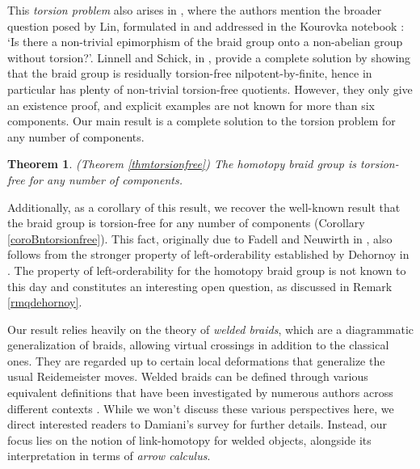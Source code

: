 \documentclass[11pt, a4paper, twoside,reqno]{amsart}
\theoremstyle{plain}
\newtheorem*{thm0}{Theorem}
\theoremstyle{definition}
\theoremstyle{remark}
\begin{document}
This \emph{torsion problem} also arises in \cite{BardaVershinJieHomotopyBraid}, where the authors mention the broader question posed by Lin, formulated in \cite{LinBraidsPermutationPolynomials} and addressed in the Kourovka notebook \cite{MazurovKhukhroKourovkaNotebook}: \lq Is there a non-trivial epimorphism of the braid group onto a non-abelian group without torsion?\rq. Linnell and Schick, in \cite{LinnellchickFinititgrpextAtiyahconj}, provide a complete solution by showing that the braid group is residually torsion-free nilpotent-by-finite, hence in particular has plenty of non-trivial torsion-free quotients. However, they only give an existence proof, and explicit examples are not known for more than six components. Our main result is a complete solution to the torsion problem for any number of components.

\begin{thm0}(Theorem \ref{thmtorsionfree})
     The homotopy braid group is torsion-free for any number of components.
\end{thm0}

Additionally, as a corollary of this result, we recover the well-known result that the braid group is torsion-free for any number of components (Corollary \ref{coroBntorsionfree}). This fact, originally due to Fadell and Neuwirth in \cite[Thm. 8]{FadellNeuwirthConfSpace}, also follows from the stronger property of left-orderability established by Dehornoy in \cite{DehornoyBraidGrpLeftDistribuOp}. The property of left-orderability for the homotopy braid group is not known to this day and constitutes an interesting open question, as discussed in Remark \ref{rmqdehornoy}.

Our result relies heavily on the theory of \emph{welded braids}, which are a diagrammatic generalization of braids, allowing virtual crossings in addition to the classical ones. They are regarded up to certain local deformations that generalize the usual Reidemeister moves. Welded braids can be defined through various equivalent definitions that have been investigated by numerous authors across different contexts \cite{FennRimanyiRourkeBraidPermuGrp,SavushkinaGrpConjAutoFreeGrp,McCoolBasisConjAutoFreeGrp,BaezWiseCransExoticStatsStrings4DTheory,BrendleHatcherConfigspaceRingsWickets,ABMWhomotopyribbontube}. While we won't discuss these various perspectives here, we direct interested readers to Damiani’s survey \cite{celestejourneyloopbraidgrp} for further details. Instead, our focus lies on the notion of link-homotopy for welded objects, alongside its interpretation in terms of \emph{arrow calculus}.
\end{document}
